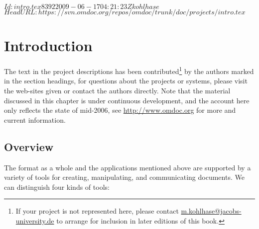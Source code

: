 \svnInfo $Id: intro.tex 8392 2009-06-17 04:21:23Z kohlhase $
\svnKeyword $HeadURL: https://svn.omdoc.org/repos/omdoc/trunk/doc/projects/intro.tex $

\chapter{Introduction}\label{chapx:projeccts-intro}
The text in the project descriptions has been contributed\footnote{If your {\omdoc}
  project is not represented here, please contact \url{m.kohlhase@jacobs-university.de} to
  arrange for inclusion in later editions of this book.} by the authors marked in the
section headings, for questions about the projects or systems, please visit the web-sites
given or contact the authors directly. Note that the material discussed in this chapter is
under continuous development, and the account here only reflects the state of mid-2006,
see \url{http://www.omdoc.org} for more and current information.


\section{Overview}\label{subsec:projects-overview}
The {\omdoc} format as a whole and the applications mentioned above are supported by a
variety of tools for creating, manipulating, and communicating {\omdoc} documents. We can
distinguish four kinds of tools:

